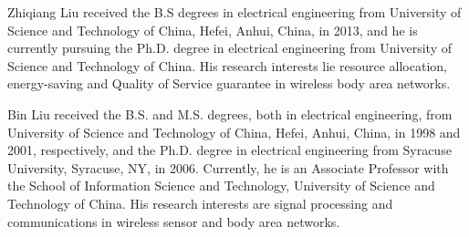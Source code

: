 \documentclass[journal,10pt]{IEEEtran}
\begin{document}
%
\newpage
\begin{IEEEbiography}{Zhiqiang Liu}
received the B.S degrees in electrical engineering from University of Science and Technology of China, Hefei, Anhui, China, in 2013, and he is currently pursuing the Ph.D. degree in electrical engineering from University of Science and Technology of China. His research interests lie resource allocation, energy-saving and Quality of Service guarantee in wireless body area networks. 
\end{IEEEbiography}%
\vspace{-20em}
\begin{IEEEbiography}{Bin Liu}
received the B.S. and M.S. degrees, both in electrical engineering, from University of Science and Technology of China, Hefei, Anhui, China, in 1998 and 2001, respectively, and the Ph.D. degree in electrical engineering from Syracuse University, Syracuse, NY, in 2006. Currently, he is an Associate Professor with the School of Information Science and Technology, University of Science and Technology of China. His research interests are signal processing and communications in wireless sensor and body area networks.
\end{IEEEbiography}%
\end{document}
